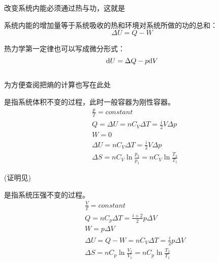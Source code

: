             改变系统内能必须通过热与功，这就是
            \begin{law}
                系统内能的增加量等于系统吸收的热和环境对系统所做的功的总和：
                \begin{equation}
                    \Delta U = Q - W
                    \nonumber
                \end{equation}
            \end{law}
            热力学第一定律也可以写成微分形式：
            \begin{equation}
                \mathrm{d}{U} = \Delta{Q} - p\mathrm{d}{V}
                \nonumber
            \end{equation}
        \subsection[过程介绍]{}
        为方便查阅把熵的计算也写在此处
        \begin{Itemize}
            \item {}是指系统体积不变的过程，此时一般容器为刚性容器。            
            \begin{equation}
                \begin{aligned}
                    &\frac{p}{T} = constant \\
                    &Q = \Delta U = nC_{V}\Delta T = \frac{i}{2}V\Delta p \\
                    &W = 0 \\
                    &\Delta U = nC_{V}\Delta T = \frac{i}{2}V\Delta p \\ 
                    &\Delta S = nC_{V}\ln\frac{p_{2}}{p_{1}} =nC_{V}\ln\frac{T_{2}}{T_{1}}
                \end{aligned}
                \nonumber
            \end{equation}
        \end{Itemize}
        (证明见)
        \begin{Itemize}
            \item {}是指系统压强不变的过程。
            \begin{equation}
                \begin{aligned}
                    &\frac{V}{T} = constant \\
                    &Q = nC_{p}\Delta T =\frac{i+2}{2}p\Delta V\\
                    &W = p\Delta{V} \\
                    &\Delta U = Q - W = nC_{V}\Delta T = \frac{i}{2}p\Delta V \\ 
                    &\Delta S = nC_{p}\ln\frac{V_{2}}{V_{1}} =nC_{p}\ln\frac{T_{2}}{T_{1}}
                \end{aligned}
                \nonumber
            \end{equation}
        \end{Itemize}
